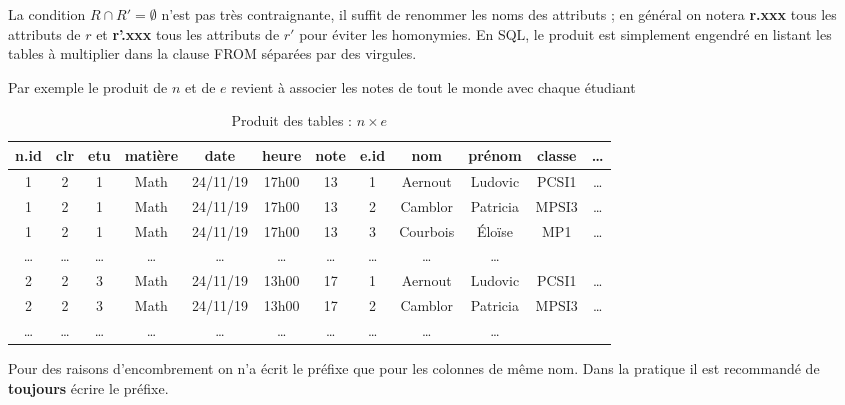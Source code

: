 La condition $R\cap R'=\emptyset$ n'est pas très contraignante, il suffit de renommer les noms des attributs ; en général on notera {\bf r.xxx} tous les attributs de $r$ et {\bf r'.xxx} tous les attributs de $r'$ pour éviter les homonymies. En SQL, le produit est simplement engendré en listant les tables à multiplier dans la clause {\sc FROM} séparées par des virgules.

Par exemple le produit de $n$  et de $e$ revient à associer les notes de tout le monde avec chaque étudiant
\begin{table}[ht]
\caption{Produit des tables : $n\times e$}
\begin{center}
\begin{tabular}{|c|c|c|c|c|c|c|c|c|c|c|c|}
\hline
{\bf n.id} &{\bf clr} &{\bf etu} & {\bf matière}&{\bf date} &{\bf heure} & {\bf note} &{\bf e.id} &{\bf nom} & {\bf prénom}&{\bf classe} & \dots\\
  \hline
1&2&1&Math&24/11/19&17h00&13&1&Aernout&Ludovic&PCSI1&\dots\\
1&2&1&Math&24/11/19&17h00&13&2&Camblor&Patricia&MPSI3&\dots\\
1&2&1&Math&24/11/19&17h00&13&3&Courbois&Éloïse&MP1&\dots\\
\dots&\dots&\dots&\dots&\dots&\dots&\dots&\dots&\dots&\dots\\
2&2&3&Math&24/11/19&13h00&17&1&Aernout&Ludovic&PCSI1&\dots\\
2&2&3&Math&24/11/19&13h00&17&2&Camblor&Patricia&MPSI3&\dots\\
\dots&\dots&\dots&\dots&\dots&\dots&\dots&\dots&\dots&\dots\\
\end{tabular}
\end{center}
\end{table}

Pour des raisons d'encombrement on n'a écrit le préfixe que pour les colonnes de même nom. Dans la pratique il est recommandé de {\bf toujours} écrire le préfixe. 
